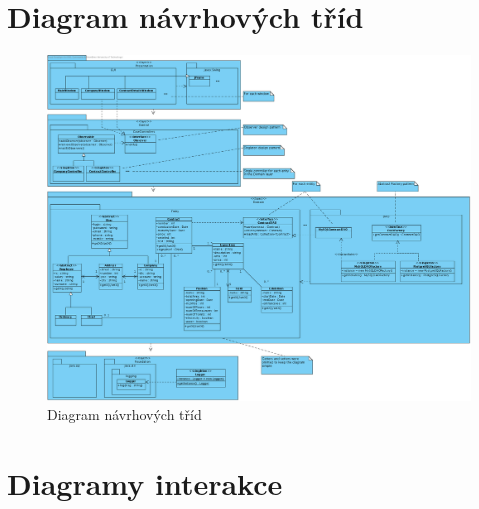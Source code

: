 \pagebreak

\section*{Diagram návrhových tříd}

\begin{figure}[H]
	\begin{adjustwidth}{-4cm}{-4cm}
		\begin{center}
			\includegraphics[width=20cm,keepaspectratio]{include/class_final}
		\end{center}
	\end{adjustwidth}
	\caption{Diagram návrhových tříd}
	\label{fig:ClassFinal}
\end{figure}

\pagebreak

\section*{Diagramy interakce}

